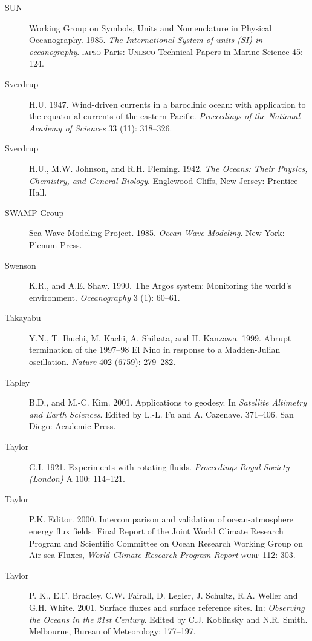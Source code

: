 \begin{description}
\item [SUN]Working Group on Symbols, Units and Nomenclature in Physical Oceanography. 1985. \textit{The International System of units (SI) in oceanography}. \textsc{iapso}  Paris: \textsc{Unesco} Technical Papers in Marine Science 45: 124.

\item [Sverdrup]H.U. 1947. Wind-driven currents in a baroclinic ocean: with
application to the equatorial currents of the eastern Pacific.
\textit{Proceedings of the National Academy of Sciences} 33 (11): 318--326.

\item [Sverdrup]H.U., M.W. Johnson, and R.H. Fleming. 1942. \textit{The Oceans:
Their Physics, Chemistry, and General Biology}.  Englewood Cliffs, New Jersey:
Prentice-Hall.

\item [SWAMP Group]Sea Wave Modeling Project. 1985. \textit{Ocean Wave Modeling}. New York: Plenum Press.

\item [Swenson]K.R., and A.E. Shaw. 1990. The Argos system: Monitoring the world's environment. \textit{Oceanography} 3 (1): 60--61.

\item [Takayabu]Y.N., T. Ihuchi, M. Kachi, A. Shibata, and H. Kanzawa. 1999. Abrupt termination of the 1997--98 El Nino in response to a Madden-Julian oscillation. \textit{Nature} 402 (6759): 279--282.

\item [Tapley]B.D., and M.-C. Kim. 2001. Applications to geodesy. In
\textit{Satellite Altimetry and Earth Sciences}. Edited by L.-L. Fu and A.
Cazenave. 371--406. San Diego: Academic Press.

\item [Taylor]G.I. 1921. Experiments with rotating fluids. \textit{Proceedings
Royal Society (London)} A 100: 114--121.

\item [Taylor]P.K. Editor. 2000. Intercomparison and validation of ocean-atmosphere energy flux fields: Final Report of the Joint World Climate Research Program and Scientific Committee on Ocean Research Working Group on Air-sea Fluxes, \textit{World Climate Research Program Report} \textsc{wcrp}-112:
303.
	
\item [Taylor]P. K., E.F. Bradley, C.W. Fairall, D. Legler, J. Schultz, R.A. Weller and G.H. White. 2001. Surface fluxes and surface reference sites. In: \textit{Observing the Oceans in the 21st Century}. Edited by C.J. Koblinsky and N.R. Smith. Melbourne, Bureau of Meteorology: 177--197.


\end{description}
